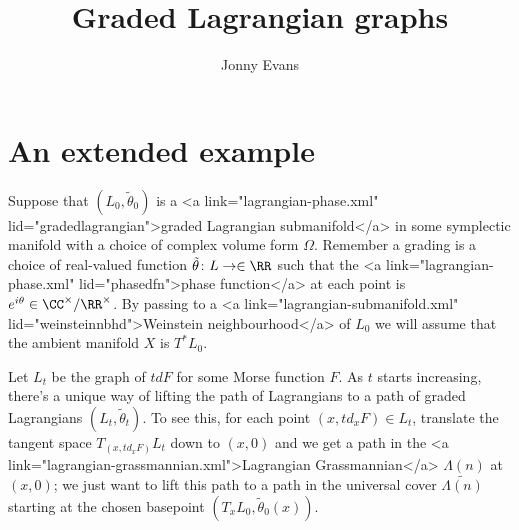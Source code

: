 \documentclass{amsart}
\title{Graded Lagrangian graphs}
\author{Jonny Evans}
\begin{document}
\section{An extended example}

Suppose that $(L_0,\tilde{\theta}_0)$ is a <a link="lagrangian-phase.xml" lid="gradedlagrangian">graded Lagrangian submanifold</a> in some symplectic manifold with a choice of complex volume form $\Omega$. Remember a grading is a choice of real-valued function $\tilde{\theta}\colon L\to\in\RR$ such that the <a link="lagrangian-phase.xml" lid="phasedfn">phase function</a> at each point is $e^{i\theta}\in\CC^{\times}/\RR^{\times}$. By passing to a <a link="lagrangian-submanifold.xml" lid="weinsteinnbhd">Weinstein neighbourhood</a> of $L_0$ we will assume that the ambient manifold $X$ is $T^*L_0$.

Let $L_t$ be the graph of $t dF$ for some Morse function $F$. As $t$ starts increasing, there's a unique way of lifting the path of Lagrangians to a path of graded Lagrangians $(L_t,\tilde{\theta}_t)$. To see this, for each point $(x,td_xF)\in L_t$, translate the tangent space $T_{(x,td_xF)}L_t$ down to $(x,0)$ and we get a path in the <a link="lagrangian-grassmannian.xml">Lagrangian Grassmannian</a> $\Lambda(n)$ at $(x,0)$; we just want to lift this path to a path in the universal cover $\widetilde{\Lambda(n)}$ starting at the chosen basepoint $(T_xL_0,\tilde{\theta}_0(x))$.
\end{document}
